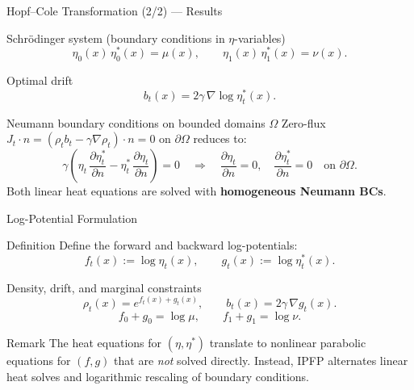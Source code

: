 \documentclass[aspectratio=169]{beamer}
\begin{document}
\begin{frame}{Hopf–Cole Transformation (2/2) — Results}

\begin{block}{Schrödinger system (boundary conditions in $\eta$-variables)}
\[
    \eta_0(x)\,\eta^*_0(x) = \mu(x), \qquad \eta_1(x)\,\eta^*_1(x) = \nu(x).
\]
\end{block}

\begin{block}{Optimal drift}
\[
    b_t(x) = 2\gamma\,\nabla\log\eta^*_t(x).
\]
\end{block}

\begin{block}{Neumann boundary conditions on bounded domains $\Omega$}
Zero-flux $J_t\cdot n = (\rho_t b_t - \gamma\nabla\rho_t)\cdot n = 0$ on $\partial\Omega$ reduces to:
\[
    \gamma\!\left(\eta_t\,\frac{\partial\eta^*_t}{\partial n} - \eta^*_t\,\frac{\partial\eta_t}{\partial n}\right) = 0
    \quad\Longrightarrow\quad
    \frac{\partial\eta_t}{\partial n} = 0, \quad \frac{\partial\eta^*_t}{\partial n} = 0 \quad\text{on } \partial\Omega.
\]
Both linear heat equations are solved with \textbf{homogeneous Neumann BCs}.
\end{block}

\end{frame}

\begin{frame}{Log-Potential Formulation}

\begin{block}{Definition}
Define the forward and backward log-potentials:
\[
    f_t(x) := \log\eta_t(x), \qquad g_t(x) := \log\eta^*_t(x).
\]
\end{block}

\begin{block}{Density, drift, and marginal constraints}
\[
    \rho_t(x) = e^{f_t(x)+g_t(x)}, \qquad b_t(x) = 2\gamma\,\nabla g_t(x).
\]
\[
    f_0 + g_0 = \log\mu, \qquad f_1 + g_1 = \log\nu.
\]
\end{block}

\begin{block}{Remark}
The heat equations for $(\eta, \eta^*)$ translate to nonlinear parabolic equations for $(f, g)$
that are \emph{not} solved directly.
Instead, IPFP alternates linear heat solves and logarithmic rescaling of boundary conditions.
\end{block}

\end{frame}
\end{document}

